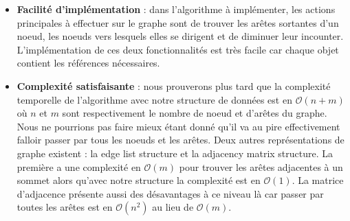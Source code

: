 \begin{itemize}
\item \textbf{Facilité d'implémentation} : dans l'algorithme à implémenter, les actions principales à effectuer sur le graphe sont de trouver les arêtes sortantes d'un noeud, les noeuds vers lesquels elles se dirigent et de diminuer leur incounter. L'implémentation de ces deux fonctionnalités est très facile car chaque objet contient les références nécessaires.

\item \textbf{Complexité satisfaisante} : nous prouverons plus tard que la complexité temporelle de l'algorithme avec notre structure de données est en $\mathcal{O}(n + m)$ où $n$ et $m$ sont respectivement le nombre de noeud et d'arêtes du graphe. Nous ne pourrions pas faire mieux étant donné qu'il va au pire effectivement falloir passer par tous les noeuds et les arêtes. Deux autres représentations de graphe existent : la edge list structure et la adjacency matrix structure. La première a une complexité en $\mathcal{O}(m)$ pour trouver les arêtes adjacentes à un sommet alors qu'avec notre structure la complexité est en $\mathcal{O}(1)$. La matrice d'adjacence présente aussi des désavantages à ce niveau là car passer par toutes les arêtes est en $\mathcal{O}(n^2)$ au lieu de $\mathcal{O}(m)$.
\end{itemize}
